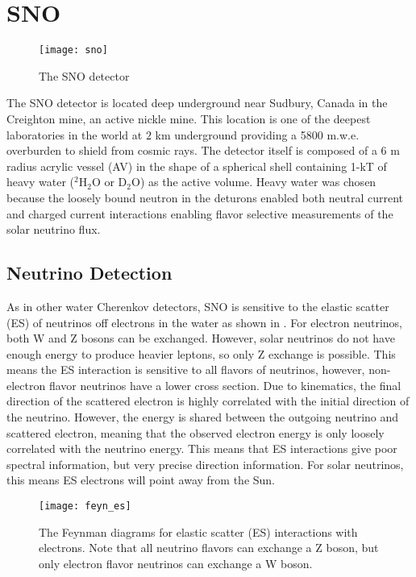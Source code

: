 \section{SNO}

\begin{figure}
\centering
    \texttt{[image: sno]}
    \caption{\label{fig:sno}The SNO detector \cite{3phase}}
\end{figure}

The SNO \cite{sno} detector is located deep underground near Sudbury, Canada in the Creighton mine, an active nickle mine.
This location is one of the deepest laboratories in the world at $2$ km underground providing a 5800 m.w.e. overburden to shield from cosmic rays.
The detector itself is composed of a 6 m radius acrylic vessel (AV) in the shape of a spherical shell containing 1-kT of heavy water ($^2$H$_2$O or D$_2$O) as the active volume.
Heavy water was chosen because the loosely bound neutron in the deturons enabled both neutral current and charged current interactions enabling flavor selective measurements of the solar neutrino flux.

\subsection{Neutrino Detection}

As in other water Cherenkov detectors, SNO is sensitive to the elastic scatter (ES) of neutrinos off electrons in the water as shown in .
For electron neutrinos, both W and Z bosons can be exchanged.
However, solar neutrinos do not have enough energy to produce heavier leptons, so only Z exchange is possible.
This means the ES interaction is sensitive to all flavors of neutrinos, however, non-electron flavor neutrinos have a lower cross section.
Due to kinematics, the final direction of the scattered electron is highly correlated with the initial direction of the neutrino.
However, the energy is shared between the outgoing neutrino and scattered electron, meaning that the observed electron energy is only loosely correlated with the neutrino energy.
This means that ES interactions give poor spectral information, but very precise direction information.
For solar neutrinos, this means ES electrons will point away from the Sun.

\begin{figure}
\centering
\texttt{[image: feyn\_es]}
\caption{\label{fig:ES}The Feynman diagrams for elastic scatter (ES) interactions with electrons. 
    Note that all neutrino flavors can exchange a Z boson, but only electron flavor neutrinos can exchange a W boson.}
\end{figure}

